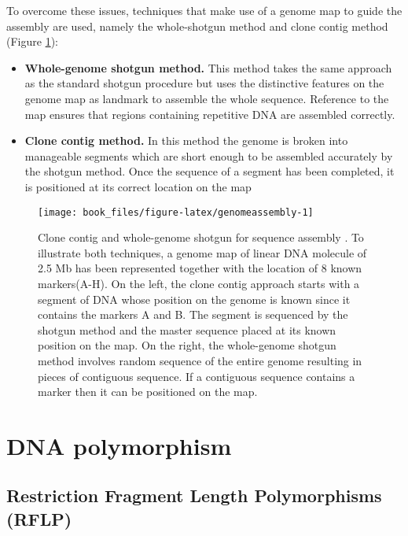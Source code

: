 \documentclass[]{book}
\begin{document}
To overcome these issues, techniques that make use of a genome map to
guide the assembly are used, namely the whole-shotgun method and clone
contig method (Figure \ref{fig:genomeassembly}):

\begin{itemize}
\item
  \textbf{Whole-genome shotgun method.} This method takes the same approach
  as the standard shotgun procedure but uses the distinctive features
  on the genome map as landmark to assemble the whole sequence.
  Reference to the map ensures that regions containing repetitive DNA
  are assembled correctly.
\item
  \textbf{Clone contig method.} In this method the genome is broken into
  manageable segments which are short enough to be assembled
  accurately by the shotgun method. Once the sequence of a segment has
  been completed, it is positioned at its correct location on the map
\end{itemize}



\begin{figure}

{\centering \texttt{[image: book\_files/figure-latex/genomeassembly-1]} 

}

\caption{Clone contig and whole-genome shotgun for sequence assembly \citep{brown2007genomes}. To illustrate both techniques, a genome map of linear DNA molecule of 2.5 Mb has been represented together with the location of 8 known markers(A-H). On the left, the clone contig approach starts with a segment of DNA whose position on the genome is known since it contains the markers A and B. The segment is sequenced by the shotgun method and the master sequence placed at its known position on the map. On the right, the whole-genome shotgun method involves random sequence of the entire genome resulting in pieces of contiguous sequence. If a contiguous sequence contains a marker then it can be positioned on the map.}\label{fig:genomeassembly}
\end{figure}

\hypertarget{dna-polymorphism}{%
\section{DNA polymorphism}\label{dna-polymorphism}}

\hypertarget{restriction-fragment-length-polymorphisms-rflp}{%
\subsection{Restriction Fragment Length Polymorphisms (RFLP)}\label{restriction-fragment-length-polymorphisms-rflp}}
\end{document}
